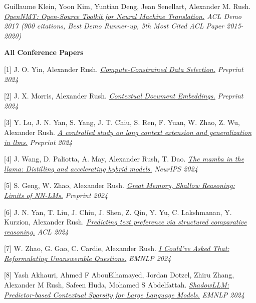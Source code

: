 \documentclass[10pt]{article}
\begin{document}
\medskip
\ind Guillaume Klein, Yoon Kim, Yuntian Deng, Jean Senellart, Alexander M. Rush. \emph{\href{ https://arxiv.org/abs/1701.02810 }{ OpenNMT: Open-Source Toolkit for Neural Machine Translation.} }\emph{ ACL Demo 2017 (900 citations, Best Demo Runner-up, 5th Most Cited ACL Paper 2015-2020) }

\medskip

\noindent\textbf{All Conference Papers \vspace{0.01in}}


[1] \ind J. O. Yin, Alexander Rush. \emph{\href{ https://arxiv.org/abs/2410.16208 }{ Compute-Constrained Data Selection.} }\emph{ Preprint 2024 }

\medskip


[2] \ind J. X. Morris, Alexander Rush. \emph{\href{ https://arxiv.org/abs/2410.02525 }{ Contextual Document Embeddings.} }\emph{ Preprint 2024 }

\medskip


[3] \ind Y. Lu, J. N. Yan, S. Yang, J. T. Chiu, S. Ren, F. Yuan, W. Zhao, Z. Wu, Alexander Rush. \emph{\href{ https://arxiv.org/abs/2409.12181 }{ A controlled study on long context extension and generalization in llms.} }\emph{ Preprint 2024 }

\medskip


[4] \ind J. Wang, D. Paliotta, A. May, Alexander Rush, T. Dao. \emph{\href{ https://arxiv.org/abs/2408.15237 }{ The mamba in the llama: Distilling and accelerating hybrid models.} }\emph{ NeurIPS 2024 }

\medskip


[5] \ind S. Geng, W. Zhao, Alexander Rush. \emph{\href{ https://arxiv.org/abs/2408.11815 }{ Great Memory, Shallow Reasoning: Limits of NN-LMs.} }\emph{ Preprint 2024 }

\medskip


[6] \ind J. N. Yan, T. Liu, J. Chiu, J. Shen, Z. Qin, Y. Yu, C. Lakshmanan, Y. Kurzion, Alexander Rush. \emph{\href{ https://aclanthology.org/2024.acl-long.839/ }{ Predicting text preference via structured comparative reasoning.} }\emph{ ACL 2024 }

\medskip


[7] \ind W. Zhao, G. Gao, C. Cardie, Alexander Rush. \emph{\href{ https://arxiv.org/abs/2407.17469 }{ I Could've Asked That: Reformulating Unanswerable Questions.} }\emph{ EMNLP 2024 }

\medskip


[8] \ind Yash Akhauri, Ahmed F AbouElhamayed, Jordan Dotzel, Zhiru Zhang, Alexander M Rush, Safeen Huda, Mohamed S Abdelfattah. \emph{\href{ https://arxiv.org/abs/2406.16635 }{ ShadowLLM: Predictor-based Contextual Sparsity for Large Language Models.} }\emph{ EMNLP 2024 }
\end{document}
